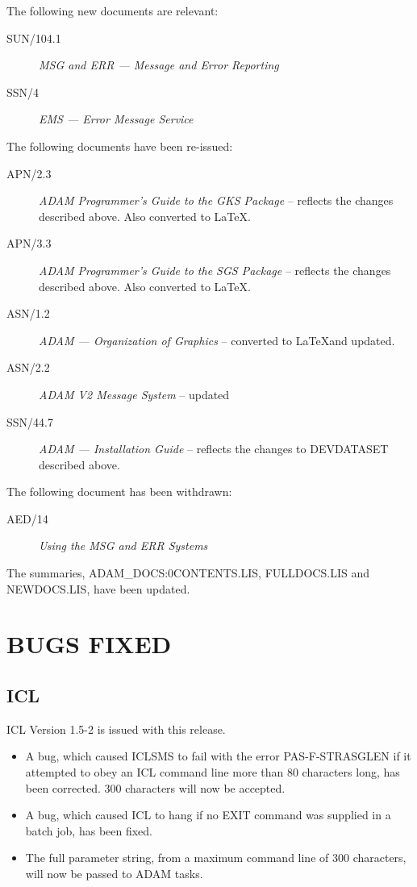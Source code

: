 The following new documents are relevant:
\begin{description}
\item[SUN/104.1] {\it MSG and ERR --- Message and Error Reporting}
\item[SSN/4] {\it EMS --- Error Message Service}
\end{description}

The following documents have been re-issued:
\begin{description}
\item[APN/2.3] {\it ADAM Programmer's Guide to the GKS Package} -- reflects
the changes described above. Also converted to \LaTeX.
\item[APN/3.3] {\it ADAM Programmer's Guide to the SGS Package} -- reflects
the changes described above. Also converted to \LaTeX.
\item[ASN/1.2] {\it ADAM --- Organization of Graphics} -- converted to
\LaTeX and updated.
\item[ASN/2.2] {\it ADAM V2 Message System} -- updated
\item[SSN/44.7] {\it ADAM --- Installation Guide} -- reflects
the changes to DEVDATASET described above.
\end{description}

The following document has been withdrawn:
\begin{description}
\item[AED/14] {\it Using the MSG and ERR Systems}
\end{description}

The summaries, ADAM\_DOCS:0CONTENTS.LIS, FULLDOCS.LIS and NEWDOCS.LIS, have 
been updated. 

\section{BUGS FIXED}
\subsection{ICL}
ICL Version 1.5-2 is issued with this release.
\begin{itemize}
\item A bug, which caused ICLSMS to fail with the error PAS-F-STRASGLEN if
it attempted to obey an ICL command line more than 80 characters long, has been
corrected.
300 characters will now be accepted.
\item A bug, which caused ICL to hang if no EXIT command was supplied in a
batch job, has been fixed.
\item The full parameter string, from a maximum command line of 300 characters,
will now be passed to ADAM tasks.
\end{itemize}

